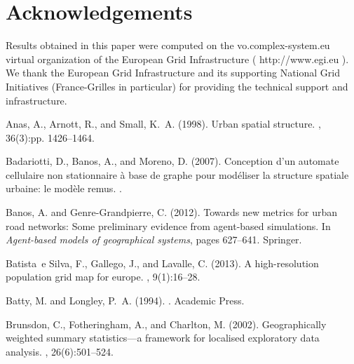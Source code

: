 \documentclass[11pt]{article}
\begin{document}
\section*{Acknowledgements}

Results obtained in this paper were computed on the vo.complex-system.eu virtual organization of the European Grid Infrastructure ( http://www.egi.eu ). We thank the European Grid Infrastructure and its supporting National Grid Initiatives (France-Grilles in particular) for providing the technical support and infrastructure.






\footnotesize

\begin{multicols}{2}
%
%

\begin{thebibliography}{}

Anas, A., Arnott, R., and Small, K.~A. (1998).
\newblock Urban spatial structure.
, 36(3):pp. 1426--1464.

Badariotti, D., Banos, A., and Moreno, D. (2007).
\newblock Conception d'un automate cellulaire non stationnaire {\`a} base de
  graphe pour mod{\'e}liser la structure spatiale urbaine: le mod{\`e}le remus.
.

Banos, A. and Genre-Grandpierre, C. (2012).
\newblock Towards new metrics for urban road networks: Some preliminary
  evidence from agent-based simulations.
\newblock In {\em Agent-based models of geographical systems}, pages 627--641.
  Springer.

Batista~e Silva, F., Gallego, J., and Lavalle, C. (2013).
\newblock A high-resolution population grid map for europe.
, 9(1):16--28.

Batty, M. and Longley, P.~A. (1994).
.
\newblock Academic Press.

Brunsdon, C., Fotheringham, A., and Charlton, M. (2002).
\newblock Geographically weighted summary statistics—a framework for
  localised exploratory data analysis.
, 26(6):501--524.


\end{thebibliography}
\end{multicols}
\end{document}
